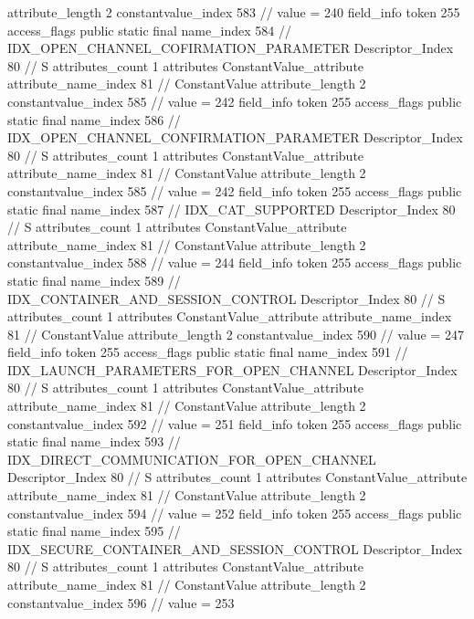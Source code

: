 {{{{{{{					attribute_length	2
					constantvalue_index	583		// value = 240
				}
				}
			}
			field_info {
				token	255
				access_flags	public static final
				name_index	584		// IDX_OPEN_CHANNEL_COFIRMATION_PARAMETER
				Descriptor_Index	80		// S
				attributes_count	1
				attributes {
				ConstantValue_attribute {
					attribute_name_index	81		// ConstantValue
					attribute_length	2
					constantvalue_index	585		// value = 242
				}
				}
			}
			field_info {
				token	255
				access_flags	public static final
				name_index	586		// IDX_OPEN_CHANNEL_CONFIRMATION_PARAMETER
				Descriptor_Index	80		// S
				attributes_count	1
				attributes {
				ConstantValue_attribute {
					attribute_name_index	81		// ConstantValue
					attribute_length	2
					constantvalue_index	585		// value = 242
				}
				}
			}
			field_info {
				token	255
				access_flags	public static final
				name_index	587		// IDX_CAT_SUPPORTED
				Descriptor_Index	80		// S
				attributes_count	1
				attributes {
				ConstantValue_attribute {
					attribute_name_index	81		// ConstantValue
					attribute_length	2
					constantvalue_index	588		// value = 244
				}
				}
			}
			field_info {
				token	255
				access_flags	public static final
				name_index	589		// IDX_CONTAINER_AND_SESSION_CONTROL
				Descriptor_Index	80		// S
				attributes_count	1
				attributes {
				ConstantValue_attribute {
					attribute_name_index	81		// ConstantValue
					attribute_length	2
					constantvalue_index	590		// value = 247
				}
				}
			}
			field_info {
				token	255
				access_flags	public static final
				name_index	591		// IDX_LAUNCH_PARAMETERS_FOR_OPEN_CHANNEL
				Descriptor_Index	80		// S
				attributes_count	1
				attributes {
				ConstantValue_attribute {
					attribute_name_index	81		// ConstantValue
					attribute_length	2
					constantvalue_index	592		// value = 251
				}
				}
			}
			field_info {
				token	255
				access_flags	public static final
				name_index	593		// IDX_DIRECT_COMMUNICATION_FOR_OPEN_CHANNEL
				Descriptor_Index	80		// S
				attributes_count	1
				attributes {
				ConstantValue_attribute {
					attribute_name_index	81		// ConstantValue
					attribute_length	2
					constantvalue_index	594		// value = 252
				}
				}
			}
			field_info {
				token	255
				access_flags	public static final
				name_index	595		// IDX_SECURE_CONTAINER_AND_SESSION_CONTROL
				Descriptor_Index	80		// S
				attributes_count	1
				attributes {
				ConstantValue_attribute {
					attribute_name_index	81		// ConstantValue
					attribute_length	2
					constantvalue_index	596		// value = 253
				}
				}
			}
}}}}
